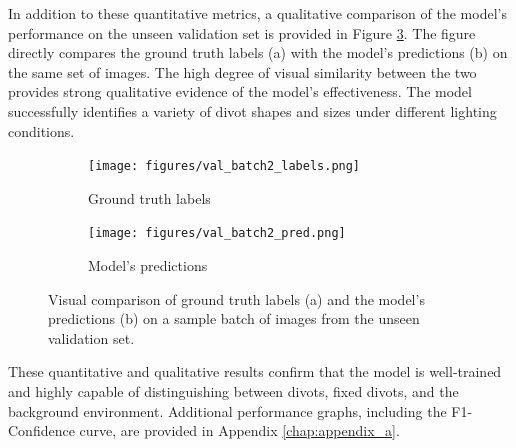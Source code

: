In addition to these quantitative metrics, a qualitative comparison of the model's performance on the unseen validation set is provided in Figure \ref{fig:validation_comparison}. The figure directly compares the ground truth labels (a) with the model's predictions (b) on the same set of images. The high degree of visual similarity between the two provides strong qualitative evidence of the model's effectiveness. The model successfully identifies a variety of divot shapes and sizes under different lighting conditions.

\begin{figure}[h!]
    \centering
    \begin{subfigure}[b]{0.49\textwidth}
        \centering
        \texttt{[image: figures/val\_batch2\_labels.png]}
        \caption{Ground truth labels}
        \label{fig:val_labels}
    \end{subfigure}
    \hfill %
    \begin{subfigure}[b]{0.49\textwidth}
        \centering
        \texttt{[image: figures/val\_batch2\_pred.png]}
        \caption{Model's predictions}
        \label{fig:val_preds}
    \end{subfigure}
    \caption{Visual comparison of ground truth labels (a) and the model's predictions (b) on a sample batch of images from the unseen validation set.}
    \label{fig:validation_comparison}
\end{figure}

These quantitative and qualitative results confirm that the model is well-trained and highly capable of distinguishing between divots, fixed divots, and the background environment. Additional performance graphs, including the F1-Confidence curve, are provided in Appendix \ref{chap:appendix_a}.


